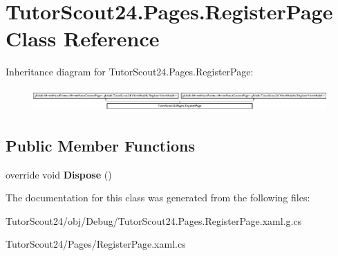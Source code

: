 \hypertarget{class_tutor_scout24_1_1_pages_1_1_register_page}{}\section{Tutor\+Scout24.\+Pages.\+Register\+Page Class Reference}
\label{class_tutor_scout24_1_1_pages_1_1_register_page}
Inheritance diagram for Tutor\+Scout24.\+Pages.\+Register\+Page\+:\begin{figure}[H]
\begin{center}
\leavevmode
\includegraphics[height=0.894569cm]{class_tutor_scout24_1_1_pages_1_1_register_page}
\end{center}
\end{figure}
\subsection*{Public Member Functions}
\begin{DoxyCompactItemize}
\item 
\mbox{\label{class_tutor_scout24_1_1_pages_1_1_register_page_a8bcd59338d7c09a953e6328287032081}} 
override void {\bfseries Dispose} ()
\end{DoxyCompactItemize}


The documentation for this class was generated from the following files\+:\begin{DoxyCompactItemize}
\item 
Tutor\+Scout24/obj/\+Debug/Tutor\+Scout24.\+Pages.\+Register\+Page.\+xaml.\+g.\+cs\item 
Tutor\+Scout24/\+Pages/Register\+Page.\+xaml.\+cs\end{DoxyCompactItemize}
